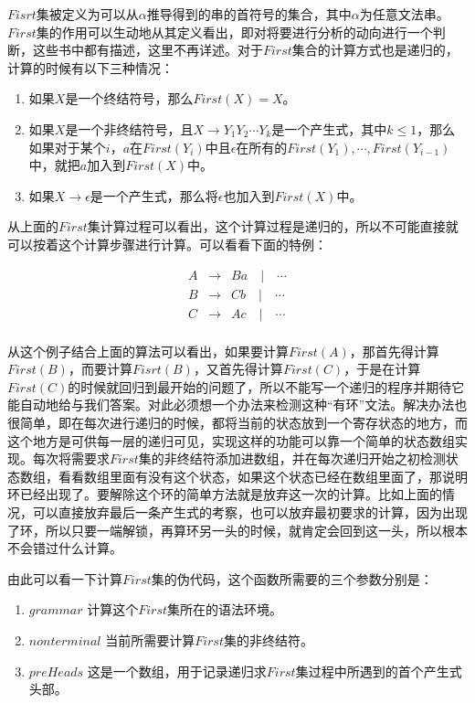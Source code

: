 $Fisrt$集被定义为可以从$\alpha$推导得到的串的首符号的集合，其中$\alpha$为任意文法串。$First$集的作用可以生动地从其定义看出，即对将要进行分析的动向进行一个判断，这些书中都有描述，这里不再详述。对于$First$集合的计算方式也是递归的，计算的时候有以下三种情况：

\begin{enumerate}
    \item 如果$X$是一个终结符号，那么$First(X)=X$。
    \item 如果$X$是一个非终结符号，且$X \rightarrow Y_1 Y_2 \cdots Y_k$是一个产生式，其中$k \leq 1$，那么如果对于某个$i$，$a$在$First(Y_i)$中且$\epsilon$在所有的$First(Y_1),\cdots,First(Y_{i-1})$中，就把$a$加入到$First(X)$中。
    \item 如果$X \rightarrow \epsilon$是一个产生式，那么将$\epsilon$也加入到$First(X)$中。
\end{enumerate}

从上面的$First$集计算过程可以看出，这个计算过程是递归的，所以不可能直接就可以按着这个计算步骤进行计算。可以看看下面的特例：

\begin{eqnarray*}
    A & \rightarrow & Ba \quad | \quad \cdots \\
    B & \rightarrow & Cb \quad | \quad \cdots \\
    C & \rightarrow & Ac \quad | \quad \cdots \\
\end{eqnarray*}

从这个例子结合上面的算法可以看出，如果要计算$First(A)$，那首先得计算$First(B)$，而要计算$Fisrt(B)$，又首先得计算$First(C)$，于是在计算$First(C)$的时候就回归到最开始的问题了，所以不能写一个递归的程序并期待它能自动地给与我们答案。对此必须想一个办法来检测这种“有环”文法。解决办法也很简单，即在每次进行递归的时候，都将当前的状态放到一个寄存状态的地方，而这个地方是可供每一层的递归可见，实现这样的功能可以靠一个简单的状态数组实现。每次将需要求$First$集的非终结符添加进数组，并在每次递归开始之初检测状态数组，看看数组里面有没有这个状态，如果这个状态已经在数组里面了，那说明环已经出现了。要解除这个环的简单方法就是放弃这一次的计算。比如上面的情况，可以直接放弃最后一条产生式的考察，也可以放弃最初要求的计算，因为出现了环，所以只要一端解锁，再算环另一头的时候，就肯定会回到这一头，所以根本不会错过什么计算。

由此可以看一下计算$First$集的伪代码，这个函数所需要的三个参数分别是：

\begin{enumerate}
    \item $grammar$ 计算这个$First$集所在的语法环境。
    \item $nonterminal$ 当前所需要计算$First$集的非终结符。
    \item $preHeads$ 这是一个数组，用于记录递归求$First$集过程中所遇到的首个产生式头部。
\end{enumerate}

